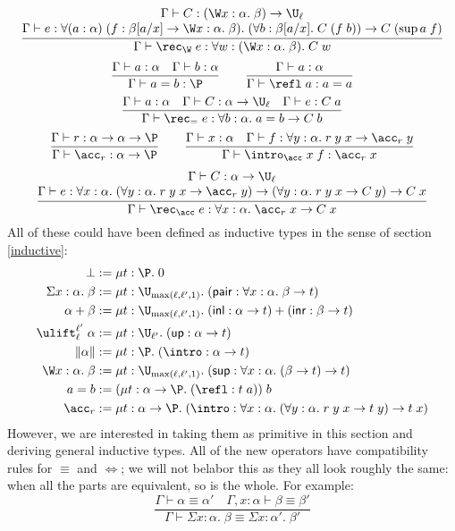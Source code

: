 $$\frac{\begin{matrix}
\Gamma\vdash C:(\W x:\alpha.\;\beta)\to\U_\ell\\
\Gamma\vdash e:\forall (a:\alpha)\;(f:\beta[a/x]\to\W x:\alpha.\;\beta).\;(\forall b:\beta[a/x].\;C\;(f\;b))\to C\;(\sup a\;f)
\end{matrix}}{\Gamma\vdash \rec_\W\;e:\forall w:(\W x:\alpha.\;\beta).\;C\;w}$$
$$\frac{\Gamma\vdash a:\alpha\quad\Gamma\vdash b:\alpha}
{\Gamma\vdash a=b:\P}\qquad
\frac{\Gamma\vdash a:\alpha}{\Gamma\vdash \refl\;a:a=a}$$
$$\frac{\Gamma\vdash a:\alpha\quad\Gamma\vdash C:\alpha\to\U_\ell\quad\Gamma\vdash e:C\;a}{\Gamma\vdash \rec_=\;e:\forall b:\alpha.\;a=b\to C\;b}$$
$$\frac{\Gamma\vdash r:\alpha\to\alpha\to\P}{\Gamma\vdash \acc_r:\alpha\to\P}\qquad
\frac{\Gamma\vdash x:\alpha\quad\Gamma\vdash f:\forall y:\alpha.\;r\;y\;x\to\acc_r\;y}{\Gamma\vdash \intro_\acc\;x\;f:\acc_r\;x}$$
$$\frac{\begin{matrix}
\Gamma\vdash C:\alpha\to\U_\ell\\
\Gamma\vdash e:\forall x:\alpha.\; (\forall y:\alpha.\;r\;y\;x\to\acc_r\;y)\to (\forall y:\alpha.\;r\;y\;x\to C\;y)\to C\;x
\end{matrix}}{\Gamma\vdash \rec_\acc\;e:\forall x:\alpha.\;\acc_r\;x\to C\;x}$$
All of these could have been defined as inductive types in the sense of section \ref{inductive}:
\begin{align*}
\bot&:=\mu t:\P.\;0\\
\Sigma x:\alpha.\;\beta&:=\mu t:\U_{\max(\ell,\ell',1)}.\;(\mathsf{pair}:\forall x:\alpha.\;\beta\to t)\\
\alpha+\beta&:=\mu t:\U_{\max(\ell,\ell',1)}.\;(\mathsf{inl}:\alpha\to t)+(\mathsf{inr}:\beta\to t)\\
\ulift_{\ell}^{\ell'}\;\alpha&:=\mu t:\U_{\ell'}.\;(\mathsf{up}:\alpha\to t)\\
\|\alpha\|&:=\mu t:\P.\;(\intro:\alpha\to t)\\
\W x:\alpha.\;\beta&:=\mu t:\U_{\max(\ell,\ell',1)}.\;(\mathsf{sup}:\forall x:\alpha.\;(\beta\to t)\to t)\\
a=b&:=(\mu t:\alpha\to\P.\;(\refl:t\;a))\;b\\
\acc_r&:=\mu t:\alpha\to\P.\;(\intro:\forall x:\alpha.\;(\forall y:\alpha.\;r\;y\;x\to t\;y)\to t\;x)
\end{align*}
However, we are interested in taking them as primitive in this section and deriving general inductive types. All of the new operators have compatibility rules for $\equiv$ and $\Leftrightarrow$; we will not belabor this as they all look roughly the same: when all the parts are equivalent, so is the whole. For example:
$$\frac{\Gamma\vdash\alpha\equiv\alpha'\quad\Gamma,x:\alpha\vdash\beta\equiv\beta'}{\Gamma\vdash\Sigma x:\alpha.\;\beta\equiv\Sigma x:\alpha'.\;\beta'}$$

